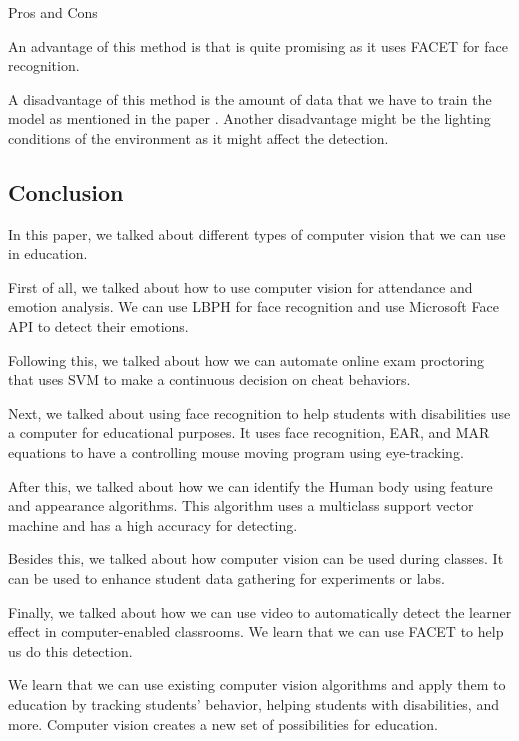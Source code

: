 \documentclass[conference]{IEEEtran}
\begin{document}
\subsubsection{}Pros and Cons 

An advantage of this method is that is quite promising as it uses FACET for face recognition. 
 
A disadvantage of this method is the amount of data that we have to train the model as mentioned in the paper \cite{b14}. Another disadvantage might be the lighting conditions of the environment as it might affect the detection.
\subsection{Conclusion}

In this paper, we talked about different types of computer vision that we can use in education.

First of all, we talked about how to use computer vision for attendance and emotion analysis. We can use LBPH for face recognition and use Microsoft Face API to detect their emotions.

Following this, we talked about how we can automate online exam proctoring that uses SVM to make a continuous decision on cheat behaviors.

Next, we talked about using face recognition to help students with disabilities use a computer for educational purposes. It uses face recognition, EAR, and MAR equations to have a controlling mouse moving program using eye-tracking.

After this, we talked about how we can identify the Human body using feature and appearance algorithms. This algorithm uses a multiclass support vector machine and has a high accuracy for detecting.

Besides this, we talked about how computer vision can be used during classes. It can be used to enhance student data gathering for experiments or labs.
 
Finally, we talked about how we can use video to automatically detect the learner effect in computer-enabled classrooms. We learn that we can use FACET to help us do this detection.

We learn that we can use existing computer vision algorithms and apply them to education by tracking students’ behavior, helping students with disabilities, and more. Computer vision creates a new set of possibilities for education.
\end{document}
